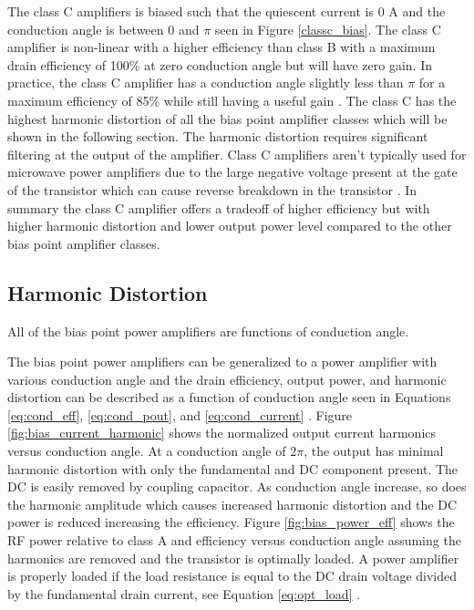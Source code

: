 The class C amplifiers is biased such that the quiescent current is 0 A and the conduction angle is between $0$ and $\pi$ seen in Figure \ref{classc_bias}. The class C amplifier is non-linear with a higher efficiency than class B with a maximum drain efficiency of 100\% at zero conduction angle but will have zero gain. In practice, the class C amplifier has a conduction angle slightly less than $\pi$ for a maximum efficiency of 85\% while still having a useful gain \cite{Raab2003}. The class C has the highest harmonic distortion of all the bias point amplifier classes which will be shown in the following section. The harmonic distortion requires significant filtering at the output of the amplifier. Class C amplifiers aren't typically used for microwave power amplifiers due to the large negative voltage present at the gate of the transistor which can cause reverse breakdown in the transistor \cite{C.Cripps2006}. In summary the class C amplifier offers a tradeoff of higher efficiency but with higher harmonic distortion and lower output power level compared to the other bias point amplifier classes.

\subsection{Harmonic Distortion}

All of the bias point power amplifiers are functions of conduction angle.

The bias point power amplifiers can be generalized to a power amplifier with various conduction angle and the drain efficiency, output power, and harmonic distortion can be described as a function of conduction angle seen in Equations \ref{eq:cond_eff}, \ref{eq:cond_pout}, and \ref{eq:cond_current} \cite{Hella}. Figure \ref{fig:bias_current_harmonic} shows the normalized output current harmonics versus conduction angle. At a conduction angle of $2\pi$, the output has minimal harmonic distortion with only the fundamental and DC component  present. The DC is easily removed by coupling capacitor. As conduction angle increase, so does the harmonic amplitude which causes increased harmonic distortion and the DC power is reduced increasing the efficiency. Figure \ref{fig:bias_power_eff} shows the RF power relative to class A and efficiency versus conduction angle assuming the harmonics are removed and the transistor is optimally loaded. A power amplifier is properly loaded if the load resistance is equal to the DC drain voltage divided by the fundamental drain current, see Equation \ref{eq:opt_load} \cite{C.Cripps2006}.


